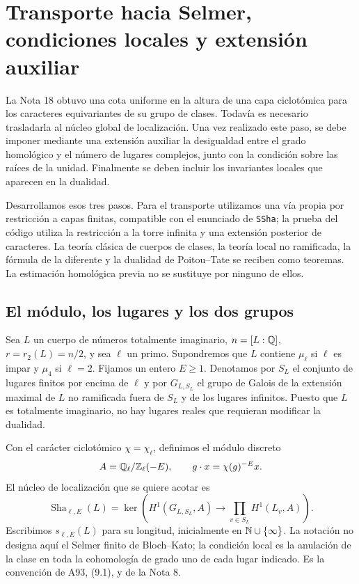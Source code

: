 \section{Transporte hacia Selmer, condiciones locales y extensión auxiliar}
\label{sec:transporte-selmer}

La Nota 18 obtuvo una cota uniforme en la altura de una capa ciclotómica para los caracteres equivariantes de su grupo de clases. Todavía es necesario trasladarla al núcleo global de localización. Una vez realizado este paso, se debe imponer mediante una extensión auxiliar la desigualdad entre el grado homológico y el número de lugares complejos, junto con la condición sobre las raíces de la unidad. Finalmente se deben incluir los invariantes locales que aparecen en la dualidad.

Desarrollamos esos tres pasos. Para el transporte utilizamos una vía propia por restricción a capas finitas, compatible con el enunciado de \texttt{SSha}; la prueba del código utiliza la restricción a la torre infinita y una extensión posterior de caracteres. La teoría clásica de cuerpos de clases, la teoría local no ramificada, la fórmula de la diferente y la dualidad de Poitou--Tate se reciben como teoremas. La estimación homológica previa no se sustituye por ninguno de ellos.

\subsection{El módulo, los lugares y los dos grupos}

Sea $L$ un cuerpo de números totalmente imaginario, $n=[L:\mathbb{Q}]$, $r=r_2(L)=n/2$, y sea $\ell$ un primo. Supondremos que $L$ contiene $\mu_\ell$ si $\ell$ es impar y $\mu_4$ si $\ell=2$. Fijamos un entero $E\ge1$. Denotamos por $S_L$ el conjunto de lugares finitos por encima de $\ell$ y por $G_{L,S_L}$ el grupo de Galois de la extensión maximal de $L$ no ramificada fuera de $S_L$ y de los lugares infinitos. Puesto que $L$ es totalmente imaginario, no hay lugares reales que requieran modificar la dualidad.

Con el carácter ciclotómico $\chi=\chi_\ell$, definimos el módulo discreto
\begin{equation}
 A=\mathbb{Q}_\ell/\mathbb{Z}_\ell(-E),\qquad g\cdot x=\chi(g)^{-E}x.
 \label{eq:ts-modulo}
\end{equation}
El núcleo de localización que se quiere acotar es
\begin{equation}
 \operatorname{Sha}_{\ell,E}(L)=\ker\left(H^1(G_{L,S_L},A)\longrightarrow
 \prod_{v\in S_L}H^1(L_v,A)\right).
 \label{eq:ts-sha}
\end{equation}
Escribimos $s_{\ell,E}(L)$ para su longitud, inicialmente en $\mathbb{N}\cup\{\infty\}$. La notación no designa aquí el Selmer finito de Bloch--Kato; la condición local es la anulación de la clase en toda la cohomología de grado uno de cada lugar indicado. Es la convención de A93, (9.1), y de la Nota 8.

